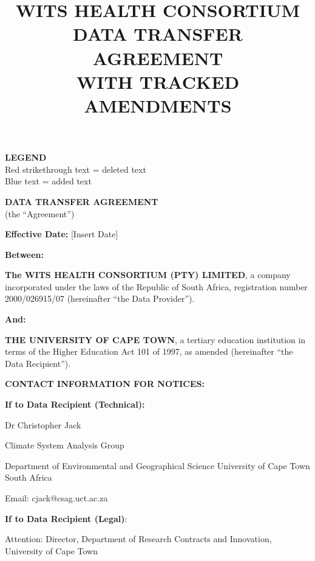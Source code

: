 \documentclass[12pt,letterpaper]{article}
\title{\textbf{WITS HEALTH CONSORTIUM\\DATA TRANSFER AGREEMENT\\WITH TRACKED AMENDMENTS}}
\author{}
\date{}
\begin{document}
\maketitle

\begin{center}
\textbf{LEGEND}\\
\textcolor{deletecolor}{Red strikethrough text} = deleted text\\
\textcolor{addcolor}{Blue text} = added text
\end{center}

\vspace{1cm}

\begin{center}
\textbf{\Large DATA TRANSFER AGREEMENT}\\
\vspace{0.5cm}
(the ``Agreement'')
\end{center}

\vspace{0.5cm}

\textbf{Effective Date:} [Insert Date]

\textbf{Between:}

\textbf{The WITS HEALTH CONSORTIUM (PTY) LIMITED}, a company incorporated under the laws of the Republic of South Africa, registration number 2000/026915/07 (hereinafter ``the Data Provider'').

\vspace{0.2cm}

\textbf{And:}

\textbf{THE UNIVERSITY OF CAPE TOWN}, a tertiary education institution in terms of the Higher Education Act 101 of 1997, as amended (hereinafter ``the Data Recipient'').

\vspace{0.5cm}

\textbf{CONTACT INFORMATION FOR NOTICES:}

\textbf{If to Data Recipient (Technical):}

Dr Christopher Jack

Climate System Analysis Group

Department of Environmental and Geographical Science University of Cape Town South Africa

Email: cjack@csag.uct.ac.za

\textbf{If to Data Recipient (Legal)}:

Attention: Director, Department of Research Contracts and Innovation, University of Cape Town
\end{document}
